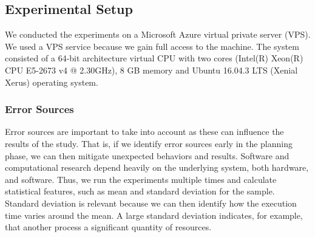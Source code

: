 \documentclass[a4paper,11pt]{kth-mag}
\newcommand*{\skippara}{\par\vspace{\baselineskip} \noindent}
\begin{document}

\subsection{Experimental Setup}\label{sec}
\skippara We conducted the experiments on a Microsoft Azure virtual private server (VPS).
We used a VPS service because we gain full access to the machine.
The system consisted of a 64-bit architecture virtual CPU with two cores (Intel(R) Xeon(R) CPU E5-2673 v4 @ 2.30GHz), 8 GB memory and Ubuntu 16.04.3 LTS (Xenial Xerus) operating system.

\subsubsection{Error Sources}
\marginnote{}
\skippara Error sources are important to take into account as these can influence the results of the study.
That is, if we identify error sources early in the planning phase, we can then mitigate unexpected behaviors and results.
Software and computational research depend heavily on the underlying system, both hardware, and software.
Thus, we run the experiments multiple times and calculate statistical features, such as mean and standard deviation for the sample.
Standard deviation is relevant because we can then identify how the execution time varies around the mean.
A large standard deviation indicates, for example, that another process a significant quantity of resources.
\end{document}
